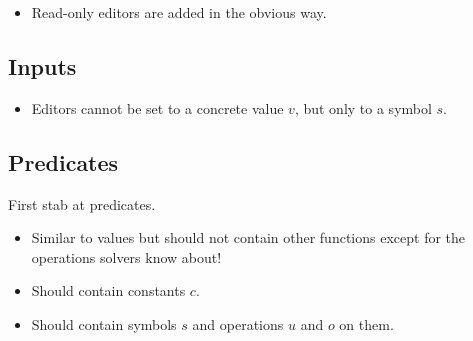 
\begin{itemize}
  \item Read-only editors are added in the obvious way.
\end{itemize}



\subsection{Inputs}


\begin{itemize}
  \item Editors cannot be set to a concrete value $v$, but only to a symbol $s$.
\end{itemize}



\subsection{Predicates}


First stab at predicates.
\begin{itemize}
  \item Similar to values but should not contain other functions except for the operations \SMT solvers know about!
  \item Should contain constants $c$.
  \item Should contain symbols $s$ and operations $u$ and $o$ on them.
\end{itemize}
